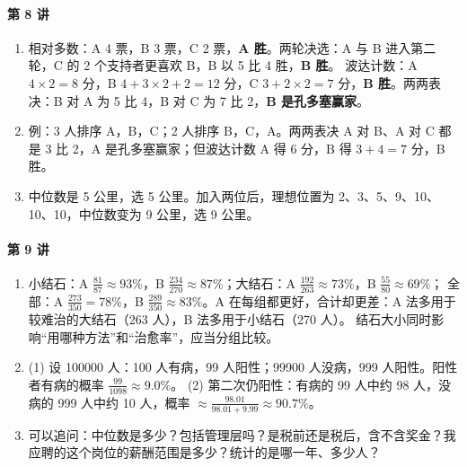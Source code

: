 \paragraph{第 8 讲}
\begin{enumerate}[label=8.\arabic*, leftmargin=2.6em]
  \item 相对多数：A 4 票，B 3 票，C 2 票，\textbf{A 胜}。两轮决选：A 与 B 进入第二轮，C 的 2 个支持者更喜欢 B，B 以 5 比 4 胜，\textbf{B 胜}。
        波达计数：A $4\times2=8$ 分，B $4+3\times2+2=12$ 分，C $3+2\times2=7$ 分，\textbf{B 胜}。两两表决：B 对 A 为 5 比 4，B 对 C 为 7 比 2，\textbf{B 是孔多塞赢家}。
  \item 例：3 人排序 A，B，C；2 人排序 B，C，A。两两表决 A 对 B、A 对 C 都是 3 比 2，A 是孔多塞赢家；但波达计数 A 得 6 分，B 得 $3+4=7$ 分，B 胜。
  \item 中位数是 5 公里，选 5 公里。加入两位后，理想位置为 2、3、5、9、10、10、10，中位数变为 9 公里，选 9 公里。
\end{enumerate}

\paragraph{第 9 讲}
\begin{enumerate}[label=9.\arabic*, leftmargin=2.6em]
  \item 小结石：A $\frac{81}{87}\approx93\%$，B $\frac{234}{270}\approx87\%$；大结石：A $\frac{192}{263}\approx73\%$，B $\frac{55}{80}\approx69\%$；
        全部：A $\frac{273}{350}=78\%$，B $\frac{289}{350}\approx83\%$。A 在每组都更好，合计却更差：A 法多用于较难治的大结石（263 人），B 法多用于小结石（270 人）。
        结石大小同时影响“用哪种方法”和“治愈率”，应当分组比较。
  \item (1) 设 100000 人：100 人有病，99 人阳性；99900 人没病，999 人阳性。阳性者有病的概率 $\frac{99}{1098}\approx9.0\%$。
        (2) 第二次仍阳性：有病的 99 人中约 98 人，没病的 999 人中约 10 人，概率 $\approx\frac{98.01}{98.01+9.99}\approx90.7\%$。
  \item 可以追问：中位数是多少？包括管理层吗？是税前还是税后，含不含奖金？我应聘的这个岗位的薪酬范围是多少？统计的是哪一年、多少人？
\end{enumerate}

